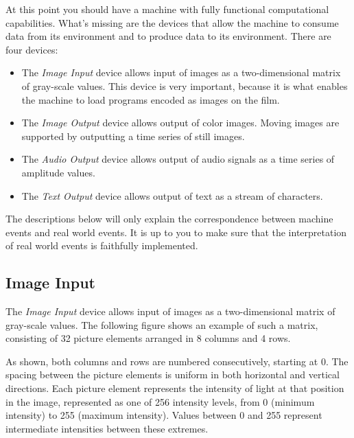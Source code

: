 \documentclass[a4paper,11pt]{article}
\begin{document}
At this point you should have a machine with fully functional computational capabilities.
What's missing are the devices that allow the machine to consume data from its environment and to produce data to its environment.
There are four devices:
\begin{itemize}
\item The \emph{Image Input} device allows input of images as a two-dimensional matrix of gray-scale values.
  This device is very important, because it is what enables the machine to load programs encoded as images on the film.
\item The \emph{Image Output} device allows output of color images.
  Moving images are supported by outputting a time series of still images.
\item The \emph{Audio Output} device allows output of audio signals as a time series of amplitude values.
\item The \emph{Text Output} device allows output of text as a stream of characters.
\end{itemize}
The descriptions below will only explain the correspondence between machine events and real world events.
It is up to you to make sure that the interpretation of real world events is faithfully implemented.

\subsection{Image Input}

The \emph{Image Input} device allows input of images as a two-dimensional matrix of gray-scale values.
The following figure shows an example of such a matrix, consisting of 32 picture elements arranged in 8 columns and 4 rows.
\begin{center}
\end{center}
As shown, both columns and rows are numbered consecutively, starting at 0.
The spacing between the picture elements is uniform in both horizontal and vertical directions.
Each picture element represents the intensity of light at that position in the image, represented as one of 256 intensity levels, from 0 (minimum intensity) to 255 (maximum intensity).
Values between 0 and 255 represent intermediate intensities between these extremes.
\end{document}
